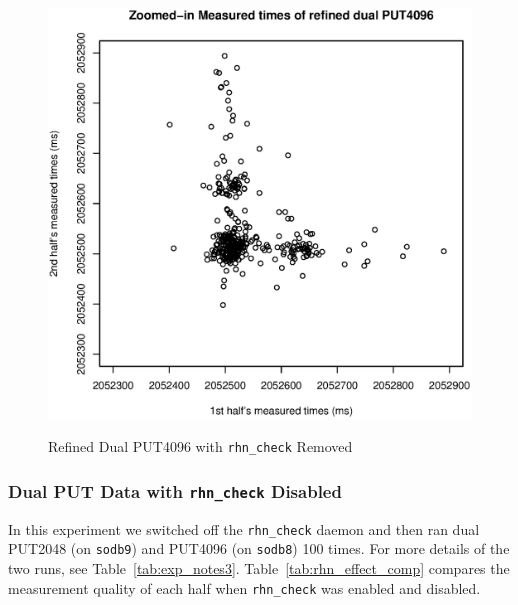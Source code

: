 \documentclass[10pt]{article}
\begin{document}
\begin{figure}[h]
{		\includegraphics[scale=0.4]{dual_put4096_new_trimmed.eps}
		\label{fig:fo_refined_dual_put4096_new_trimmed}
	}
	\caption{Refined Dual PUT4096 with {\tt rhn\_check} Removed~\label{fig:new_put4096}}
\end{figure}

\clearpage
\newpage

\subsubsection{Dual PUT Data with {\tt rhn\_check} Disabled}
In this experiment we switched off the {\tt rhn\_check} daemon and then ran dual PUT2048 (on {\tt sodb9}) and PUT4096 (on {\tt sodb8}) 100 times.
For more details of the two runs, see Table~\ref{tab:exp_notes3}. 
Table~\ref{tab:rhn_effect_comp} compares the measurement quality of 
each half when {\tt rhn\_check} was enabled and disabled. 

\end{document}
